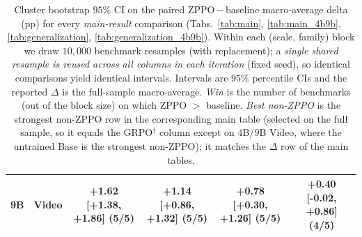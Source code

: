 \begin{table}[!htbp]
{\begin{tabular}{llcccc}
        9B & Video & +1.62 [+1.38, +1.86] (5/5) & +1.14 [+0.86, +1.32] (5/5) & +0.78 [+0.30, +1.26] (5/5) & +0.40 [-0.02, +0.86] (4/5) \\
        \bottomrule
    \end{tabular}%
    }
    \caption{Cluster bootstrap $95\%$ CI on the paired ZPPO\,$-$\,baseline macro-average delta (pp) for every \emph{main-result} comparison (Tabs.~\ref{tab:main}, \ref{tab:main_4b9b}, \ref{tab:generalization}, \ref{tab:generalization_4b9b}). Within each (scale, family) block we draw $10{,}000$ benchmark resamples (with replacement); a \emph{single shared resample is reused across all columns in each iteration} (fixed seed), so identical comparisons yield identical intervals. Intervals are $95\%$ percentile CIs and the reported $\Delta$ is the full-sample macro-average. \emph{Win} is the number of benchmarks (out of the block size) on which ZPPO $>$ baseline. \emph{Best non-ZPPO} is the strongest non-ZPPO row in the corresponding main table (selected on the full sample, so it equals the GRPO$^{\dagger}$ column except on $4$B/$9$B Video, where the untrained Base is the strongest non-ZPPO); it matches the $\Delta$ row of the main tables.}
    \label{tab:appendix:ci_main}
\end{table}
